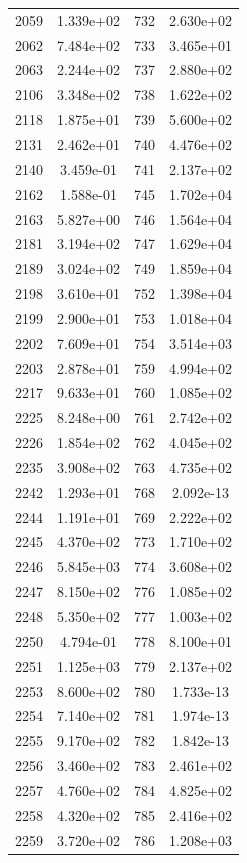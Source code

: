 \documentclass[12pt]{article}
\begin{document}
\begin{longtable}{@{}cccc@{}}
2059 & 1.339e+02 & 732 & 2.630e+02 \\
2062 & 7.484e+02 & 733 & 3.465e+01 \\
2063 & 2.244e+02 & 737 & 2.880e+02 \\
2106 & 3.348e+02 & 738 & 1.622e+02 \\
2118 & 1.875e+01 & 739 & 5.600e+02 \\
2131 & 2.462e+01 & 740 & 4.476e+02 \\
2140 & 3.459e-01 & 741 & 2.137e+02 \\
2162 & 1.588e-01 & 745 & 1.702e+04 \\
2163 & 5.827e+00 & 746 & 1.564e+04 \\
2181 & 3.194e+02 & 747 & 1.629e+04 \\
2189 & 3.024e+02 & 749 & 1.859e+04 \\
2198 & 3.610e+01 & 752 & 1.398e+04 \\
2199 & 2.900e+01 & 753 & 1.018e+04 \\
2202 & 7.609e+01 & 754 & 3.514e+03 \\
2203 & 2.878e+01 & 759 & 4.994e+02 \\
2217 & 9.633e+01 & 760 & 1.085e+02 \\
2225 & 8.248e+00 & 761 & 2.742e+02 \\
2226 & 1.854e+02 & 762 & 4.045e+02 \\
2235 & 3.908e+02 & 763 & 4.735e+02 \\
2242 & 1.293e+01 & 768 & 2.092e-13 \\
2244 & 1.191e+01 & 769 & 2.222e+02 \\
2245 & 4.370e+02 & 773 & 1.710e+02 \\
2246 & 5.845e+03 & 774 & 3.608e+02 \\
2247 & 8.150e+02 & 776 & 1.085e+02 \\
2248 & 5.350e+02 & 777 & 1.003e+02 \\
2250 & 4.794e-01 & 778 & 8.100e+01 \\
2251 & 1.125e+03 & 779 & 2.137e+02 \\
2253 & 8.600e+02 & 780 & 1.733e-13 \\
2254 & 7.140e+02 & 781 & 1.974e-13 \\
2255 & 9.170e+02 & 782 & 1.842e-13 \\
2256 & 3.460e+02 & 783 & 2.461e+02 \\
2257 & 4.760e+02 & 784 & 4.825e+02 \\
2258 & 4.320e+02 & 785 & 2.416e+02 \\
2259 & 3.720e+02 & 786 & 1.208e+03 \\

\end{longtable}
\end{document}
